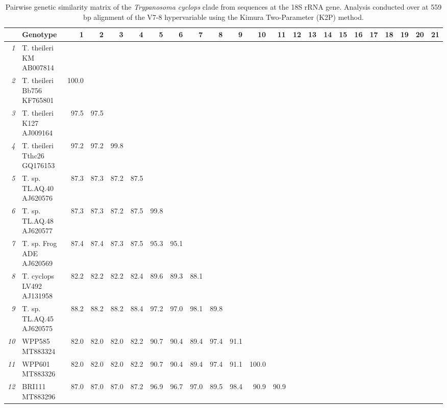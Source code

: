 \documentclass[a4paper, nobind]{templates/ociamthesis}
\begin{document}
\begin{landscape}\begingroup\fontsize{8.5}{10.5}\selectfont

\begin{longtable}[t]{>{}rlrrrrrrrrrrrrrrrrrrrrl}
\caption[Pairwise genetic similarity matrix of the \textit{Trypanosoma cyclops} clade.]{\label{tab:TA62}Pairwise genetic similarity matrix of the \textit{Trypanosoma cyclops} clade from sequences at the 18S rRNA gene. Analysis conducted over at 559 bp alignment of the V7-8 hypervariable using the Kimura Two-Parameter (K2P) method.}\\
\toprule
 & Genotype & 1 & 2 & 3 & 4 & 5 & 6 & 7 & 8 & 9 & 10 & 11 & 12 & 13 & 14 & 15 & 16 & 17 & 18 & 19 & 20 & 21\\
\midrule
\em{1} & T. theileri KM AB007814 &  &  &  &  &  &  &  &  &  &  &  &  &  &  &  &  &  &  &  &  & \\
\em{2} & T. theileri Bb756 KF765801 & 100.0 &  &  &  &  &  &  &  &  &  &  &  &  &  &  &  &  &  &  &  & \\
\em{3} & T. theileri K127 AJ009164 & 97.5 & 97.5 &  &  &  &  &  &  &  &  &  &  &  &  &  &  &  &  &  &  & \\
\em{4} & T. theileri Tthc26 GQ176153 & 97.2 & 97.2 & 99.8 &  &  &  &  &  &  &  &  &  &  &  &  &  &  &  &  &  & \\
\em{5} & T. sp. TL.AQ.40 AJ620576 & 87.3 & 87.3 & 87.2 & 87.5 &  &  &  &  &  &  &  &  &  &  &  &  &  &  &  &  & \\
\em{6} & T. sp. TL.AQ.48 AJ620577 & 87.3 & 87.3 & 87.2 & 87.5 & 99.8 &  &  &  &  &  &  &  &  &  &  &  &  &  &  &  & \\
\em{7} & T. sp. Frog ADE AJ620569 & 87.4 & 87.4 & 87.3 & 87.5 & 95.3 & 95.1 &  &  &  &  &  &  &  &  &  &  &  &  &  &  & \\
\em{8} & T. cyclops LV492 AJ131958 & 82.2 & 82.2 & 82.2 & 82.4 & 89.6 & 89.3 & 88.1 &  &  &  &  &  &  &  &  &  &  &  &  &  & \\
\em{9} & T. sp. TL.AQ.45 AJ620575 & 88.2 & 88.2 & 88.2 & 88.4 & 97.2 & 97.0 & 98.1 & 89.8 &  &  &  &  &  &  &  &  &  &  &  &  & \\
\em{10} & WPP585 MT883324 & 82.0 & 82.0 & 82.0 & 82.2 & 90.7 & 90.4 & 89.4 & 97.4 & 91.1 &  &  &  &  &  &  &  &  &  &  &  & \\
\em{11} & WPP601 MT883326 & 82.0 & 82.0 & 82.0 & 82.2 & 90.7 & 90.4 & 89.4 & 97.4 & 91.1 & 100.0 &  &  &  &  &  &  &  &  &  &  & \\
\em{12} & BRI111 MT883296 & 87.0 & 87.0 & 87.0 & 87.2 & 96.9 & 96.7 & 97.0 & 89.5 & 98.4 & 90.9 & 90.9 &  &  &  &  &  &  &  &  &  & \\

\end{longtable}
\end{landscape}
\end{document}
